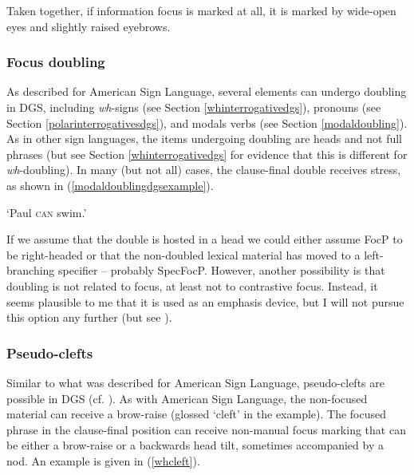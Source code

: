 \noindent Taken together, if information focus is marked at all, it is marked by wide-open eyes and slightly raised eyebrows. 



\subsubsection{Focus doubling}
As described for American Sign Language, several elements can undergo doubling in DGS, including \textit{wh}-signs (see Section \ref{whinterrogativedgs}), pronouns (see Section \ref{polarinterrogativesdgs}), and modals verbs (see Section \ref{modaldoubling}). As in other sign languages, the items undergoing doubling are heads and not full phrases (but see Section \ref{whinterrogativedgs} for evidence that this is different for \textit{wh}-doubling). In many (but not all) cases, the clause-final double receives stress, as shown in (\ref{modaldoublingdgsexample}). 

\begin{exe}
\ex {} 
\glt `Paul \textsc{can} swim.' \label{modaldoublingdgsexample}
\end{exe}

\noindent If we assume that the double is hosted in a head we could either assume FocP to be right-headed or that the non-doubled lexical material has moved to a left-branching specifier -- probably SpecFocP. However, another possibility is that doubling is not related to focus, at least not to contrastive focus. Instead, it seems plausible to me that it is used as an emphasis device, but I will not pursue this option any further (but see \citealt{wilbur2012informationstructure}).



\subsubsection{Pseudo-clefts}
Similar to what was described for American Sign Language, pseudo-clefts are possible in DGS (cf. \citealt[397]{happ2014vork}). As with American Sign Language, the non-focused material can receive a brow-raise (glossed `cleft' in the example). The focused phrase in the clause-final position can receive non-manual focus marking that can be either a brow-raise or a backwards head tilt, sometimes accompanied by a nod. An example is given in (\ref{whcleft}).%

